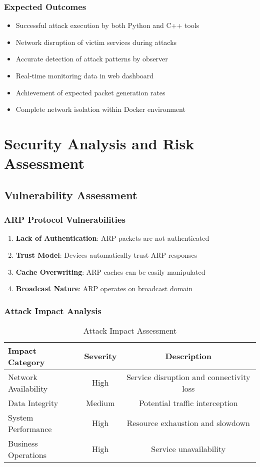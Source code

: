 \documentclass[12pt,a4paper]{article}
\begin{document}
\subsubsection{Expected Outcomes}
\begin{itemize}
    \item Successful attack execution by both Python and C++ tools
    \item Network disruption of victim services during attacks
    \item Accurate detection of attack patterns by observer
    \item Real-time monitoring data in web dashboard
    \item Achievement of expected packet generation rates
    \item Complete network isolation within Docker environment
\end{itemize}

\section{Security Analysis and Risk Assessment}

\subsection{Vulnerability Assessment}

\subsubsection{ARP Protocol Vulnerabilities}
\begin{enumerate}
    \item \textbf{Lack of Authentication}: ARP packets are not authenticated
    \item \textbf{Trust Model}: Devices automatically trust ARP responses
    \item \textbf{Cache Overwriting}: ARP caches can be easily manipulated
    \item \textbf{Broadcast Nature}: ARP operates on broadcast domain
\end{enumerate}

\subsubsection{Attack Impact Analysis}
\begin{table}[H]
\centering
\caption{Attack Impact Assessment}
\begin{tabular}{|l|c|c|}
\hline
\textbf{Impact Category} & \textbf{Severity} & \textbf{Description} \\
\hline
Network Availability & High & Service disruption and connectivity loss \\
\hline
Data Integrity & Medium & Potential traffic interception \\
\hline
System Performance & High & Resource exhaustion and slowdown \\
\hline
Business Operations & High & Service unavailability \\
\hline
\end{tabular}
\end{table}
\end{document}
